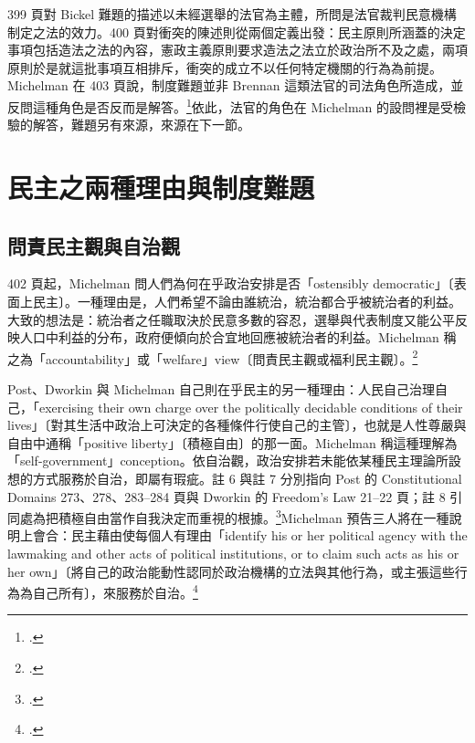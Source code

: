 399 頁對 Bickel 難題的描述以未經選舉的法官為主體，所問是法官裁判民意機構制定之法的效力。400 頁對衝突的陳述則從兩個定義出發：民主原則所涵蓋的決定事項包括造法之法的內容，憲政主義原則要求造法之法立於政治所不及之處，兩項原則於是就這批事項互相排斥，衝突的成立不以任何特定機關的行為為前提。Michelman 在 403 頁說，制度難題並非 Brennan 這類法官的司法角色所造成，並反問這種角色是否反而是解答。\footcite[403]{michelman1998}依此，法官的角色在 Michelman 的設問裡是受檢驗的解答，難題另有來源，來源在下一節。

\section{民主之兩種理由與制度難題}
\label{sec:10_problem-5}

\subsection{問責民主觀與自治觀}

402 頁起，Michelman 問人們為何在乎政治安排是否「ostensibly democratic」〔表面上民主〕。一種理由是，人們希望不論由誰統治，統治都合乎被統治者的利益。大致的想法是：統治者之任職取決於民意多數的容忍，選舉與代表制度又能公平反映人口中利益的分布，政府便傾向於合宜地回應被統治者的利益。Michelman 稱之為「accountability」或「welfare」view〔問責民主觀或福利民主觀〕。\footcite[402]{michelman1998}

Post、Dworkin 與 Michelman 自己則在乎民主的另一種理由：人民自己治理自己，「exercising their own charge over the politically decidable conditions of their lives」〔對其生活中政治上可決定的各種條件行使自己的主管〕，也就是人性尊嚴與自由中通稱「positive liberty」〔積極自由〕的那一面。Michelman 稱這種理解為「self-government」conception。依自治觀，政治安排若未能依某種民主理論所設想的方式服務於自治，即屬有瑕疵。註 6 與註 7 分別指向 Post 的 Constitutional Domains 273、278、283--284 頁與 Dworkin 的 Freedom's Law 21--22 頁；註 8 引同處為把積極自由當作自我決定而重視的根據。\footcite[402 nn.6--8]{michelman1998}Michelman 預告三人將在一種說明上會合：民主藉由使每個人有理由「identify his or her political agency with the lawmaking and other acts of political institutions, or to claim such acts as his or her own」〔將自己的政治能動性認同於政治機構的立法與其他行為，或主張這些行為為自己所有〕，來服務於自治。\footcite[402]{michelman1998}

